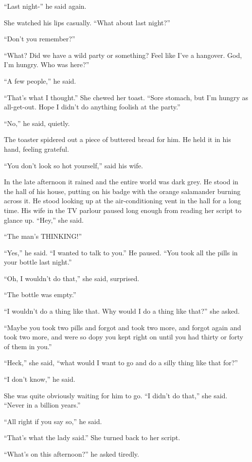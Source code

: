 \documentclass[11pt,openany]{book}
\begin{document}
``Last night-'' he said again.

She watched his lips casually. ``What about last night?''

``Don't you remember?''

``What? Did we have a wild party or something? Feel like I've a hangover. God, I'm hungry. Who was here?''

``A few people,'' he said.

``That's what I thought.'' She chewed her toast. ``Sore stomach, but I'm hungry as all-get-out. Hope I didn't do anything foolish at the party.''

``No,'' he said, quietly.

The toaster spidered out a piece of buttered bread for him. He held it in his hand, feeling grateful.

``You don't look so hot yourself,'' said his wife.

In the late afternoon it rained and the entire world was dark grey. He stood in the hall of his house, putting on his badge with the orange salamander burning across it. He stood looking up at the air-conditioning vent in the hall for a long time. His wife in the TV parlour paused long enough from reading her script to glance up. ``Hey,'' she said.

``The man's THINKING!''

``Yes,'' he said. ``I wanted to talk to you.'' He paused. ``You took all the pills in your bottle last night.''

``Oh, I wouldn't do that,'' she said, surprised.

``The bottle was empty.''

``I wouldn't do a thing like that. Why would I do a thing like that?'' she asked.

``Maybe you took two pills and forgot and took two more, and forgot again and took two more, and were so dopy you kept right on until you had thirty or forty of them in you.''

``Heck,'' she said, ``what would I want to go and do a silly thing like that for?''

``I don't know,'' he said.

She was quite obviously waiting for him to go. ``I didn't do that,'' she said. ``Never in a billion years.''

``All right if you say so,'' he said.

``That's what the lady said.'' She turned back to her script.

``What's on this afternoon?'' he asked tiredly.
\end{document}
